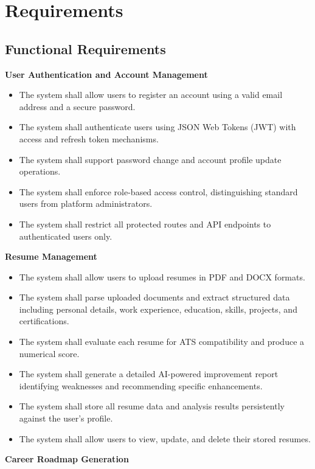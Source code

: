 \documentclass[12pt]{article}
\begin{document}
\clearpage
\section{Requirements}

\subsection{Functional Requirements}

\textbf{User Authentication and Account Management}

\begin{itemize}
  \item The system shall allow users to register an account using a valid email address and a secure password.
  \item The system shall authenticate users using JSON Web Tokens (JWT) with access and refresh token mechanisms.
  \item The system shall support password change and account profile update operations.
  \item The system shall enforce role-based access control, distinguishing standard users from platform administrators.
  \item The system shall restrict all protected routes and API endpoints to authenticated users only.
\end{itemize}

\textbf{Resume Management}

\begin{itemize}
  \item The system shall allow users to upload resumes in PDF and DOCX formats.
  \item The system shall parse uploaded documents and extract structured data including personal details, work experience, education, skills, projects, and certifications.
  \item The system shall evaluate each resume for ATS compatibility and produce a numerical score.
  \item The system shall generate a detailed AI-powered improvement report identifying weaknesses and recommending specific enhancements.
  \item The system shall store all resume data and analysis results persistently against the user's profile.
  \item The system shall allow users to view, update, and delete their stored resumes.
\end{itemize}

\textbf{Career Roadmap Generation}
\end{document}
